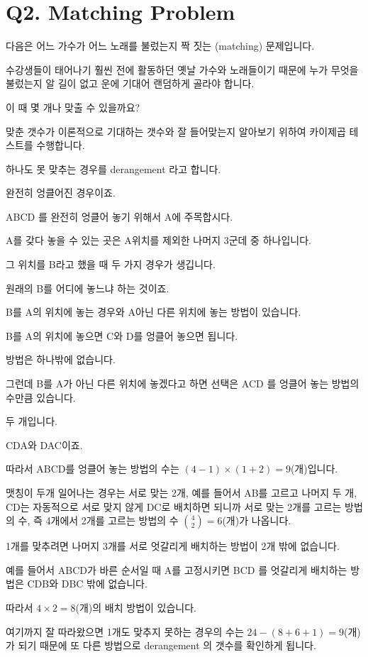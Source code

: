 \documentclass[
]{book}
\begin{document}
\section{Q2. Matching Problem}\label{q2.-matching-problem-1}

다음은 어느 가수가 어느 노래를 불렀는지 짝 짓는 (matching) 문제입니다.

수강생들이 태어나기 훨씬 전에 활동하던 옛날 가수와 노래들이기 때문에 누가 무엇을 불렀는지 알 길이 없고 운에 기대어 랜덤하게 골라야 합니다.

이 때 몇 개나 맞출 수 있을까요?

맞춘 갯수가 이론적으로 기대하는 갯수와 잘 들어맞는지 알아보기 위하여 카이제곱 테스트를 수행합니다.

하나도 못 맞추는 경우를 derangement 라고 합니다.

완전히 엉클어진 경우이죠.

ABCD 를 완전히 엉클어 놓기 위해서 A에 주목합시다.

A를 갖다 놓을 수 있는 곳은 A위치를 제외한 나머지 3군데 중 하나입니다.

그 위치를 B라고 했을 때 두 가지 경우가 생깁니다.

원래의 B를 어디에 놓느냐 하는 것이죠.

B를 A의 위치에 놓는 경우와 A아닌 다른 위치에 놓는 방법이 있습니다.

B를 A의 위치에 놓으면 C와 D를 엉클어 놓으면 됩니다.

방법은 하나밖에 없습니다.

그런데 B를 A가 아닌 다른 위치에 놓겠다고 하면 선택은 ACD 를 엉클어 놓는 방법의 수만큼 있습니다.

두 개입니다.

CDA와 DAC이죠.

따라서 ABCD를 엉클어 놓는 방법의 수는 \((4 - 1)\times(1 + 2) = 9\)(개)입니다.

맷칭이 두개 일어나는 경우는 서로 맞는 2개, 예를 들어서 AB를 고르고 나머지 두 개, CD는 자동적으로 서로 맞지 않게 DC로 배치하면 되니까 서로 맞는 2개를 고르는 방법의 수, 즉 4개에서 2개를 고르는 방법의 수 \(\binom{4}{2} = 6\)(개)가 나옵니다.

1개를 맞추려면 나머지 3개를 서로 엇갈리게 배치하는 방법이 2개 밖에 없습니다.

예를 들어서 ABCD가 바른 순서일 때 A를 고정시키면 BCD 를 엇갈리게 배치하는 방법은 CDB와 DBC 밖에 없습니다.

따라서 \(4\times2 = 8\)(개)의 배치 방법이 있습니다.

여기까지 잘 따라왔으면 1개도 맞추지 못하는 경우의 수는 \(24 - (8 + 6 + 1) = 9\)(개)가 되기 때문에 또 다른 방법으로 derangement 의 갯수를 확인하게 됩니다.
\end{document}
